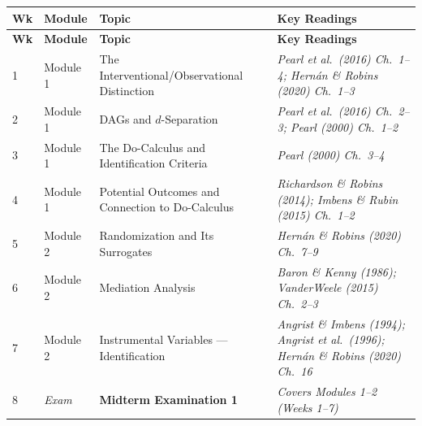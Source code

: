 \documentclass[12pt]{article}
\begin{document}
\begin{longtable}{C{0.6cm} L{1.5cm} L{5.5cm} L{5.8cm}}
  \toprule
  \color{white}\textbf{Wk} &
  \color{white}\textbf{Module} &
  \color{white}\textbf{Topic} &
  \color{white}\textbf{Key Readings} \\
  \midrule
  \endfirsthead
  \toprule
  \color{white}\textbf{Wk} &
  \color{white}\textbf{Module} &
  \color{white}\textbf{Topic} &
  \color{white}\textbf{Key Readings} \\
  \midrule
  \endhead
  \bottomrule
  \endfoot

  1 & Module 1 & The Interventional/Observational Distinction
    & \textit{Pearl et al.\ (2016) Ch.~1--4;
              Hern\'an \& Robins (2020) Ch.~1--3} \\
  2 & Module 1 & DAGs and $d$-Separation
    & \textit{Pearl et al.\ (2016) Ch.~2--3;
              Pearl (2000) Ch.~1--2} \\
  3 & Module 1 & The Do-Calculus and Identification Criteria
    & \textit{Pearl (2000) Ch.~3--4} \\
  4 & Module 1 & Potential Outcomes and Connection to Do-Calculus
    & \textit{Richardson \& Robins (2014);
              Imbens \& Rubin (2015) Ch.~1--2} \\
  \midrule

  5 & Module 2 & Randomization and Its Surrogates
    & \textit{Hern\'an \& Robins (2020) Ch.~7--9} \\
  6 & Module 2 & Mediation Analysis
    & \textit{Baron \& Kenny (1986);
              VanderWeele (2015) Ch.~2--3} \\
  7 & Module 2 & Instrumental Variables --- Identification
    & \textit{Angrist \& Imbens (1994); Angrist et al.\ (1996);
              Hern\'an \& Robins (2020) Ch.~16} \\
  \midrule

  8 & \textit{Exam} & \textbf{Midterm Examination 1}
    & \textit{Covers Modules 1--2 (Weeks 1--7)} \\
  \midrule


\end{longtable}
\end{document}
